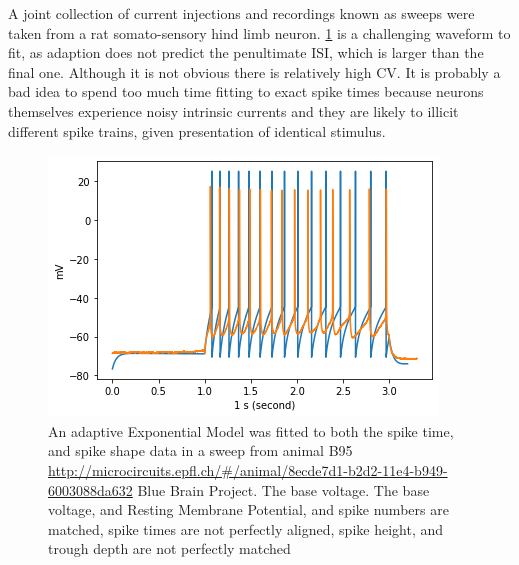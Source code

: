 

A joint collection of current injections and recordings known as sweeps were taken from a rat somato-sensory hind limb neuron.
\ref{fig:B95Adexp} is a challenging waveform to fit, as adaption does not predict the penultimate ISI, which is larger than the final one. Although it is not obvious there is relatively high CV. It is probably a bad idea to spend too much time fitting to exact spike times because neurons themselves experience noisy intrinsic currents and they are likely to illicit different spike trains, given presentation of identical stimulus.

\begin{figure}
    \centering
    \includegraphics[scale=0.75]{figures/bbp_multispiking_fit.png}
    \caption{An adaptive Exponential Model was fitted to both the spike time, and spike shape data in a sweep from animal B95 \url{http://microcircuits.epfl.ch/#/animal/8ecde7d1-b2d2-11e4-b949-6003088da632} Blue Brain Project. The base voltage. The base voltage, and Resting Membrane Potential, and spike numbers are matched, spike times are not perfectly aligned, spike height, and trough depth are not perfectly matched}
    \label{fig:B95Adexp}
\end{figure}

